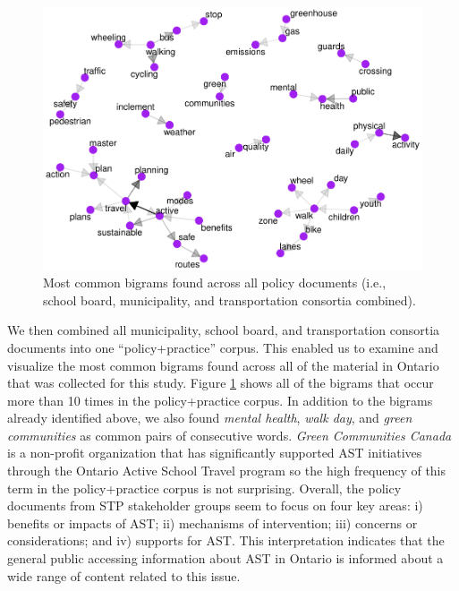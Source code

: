 \documentclass[]{elsarticle} %
\begin{document}
\begin{figure}

{\centering \includegraphics[width=1\linewidth]{AST-Framing-Ontario_files/figure-latex/policy-visual-1} 

}

\caption{\label{fig:policy-visual}Most common bigrams found across all policy documents (i.e., school board, municipality, and transportation consortia combined).}\label{fig:policy-visual}
\end{figure}

We then combined all municipality, school board, and transportation
consortia documents into one ``policy+practice'' corpus. This enabled us
to examine and visualize the most common bigrams found across all of the
material in Ontario that was collected for this study. Figure
\ref{fig:policy-visual} shows all of the bigrams that occur more than 10
times in the policy+practice corpus. In addition to the bigrams already
identified above, we also found \emph{mental health}, \emph{walk day},
and \emph{green communities} as common pairs of consecutive words.
\emph{Green Communities Canada} is a non-profit organization that has
significantly supported AST initiatives through the Ontario Active
School Travel program so the high frequency of this term in the
policy+practice corpus is not surprising. Overall, the policy documents
from STP stakeholder groups seem to focus on four key areas: i) benefits
or impacts of AST; ii) mechanisms of intervention; iii) concerns or
considerations; and iv) supports for AST. This interpretation indicates
that the general public accessing information about AST in Ontario is
informed about a wide range of content related to this issue.
\end{document}
